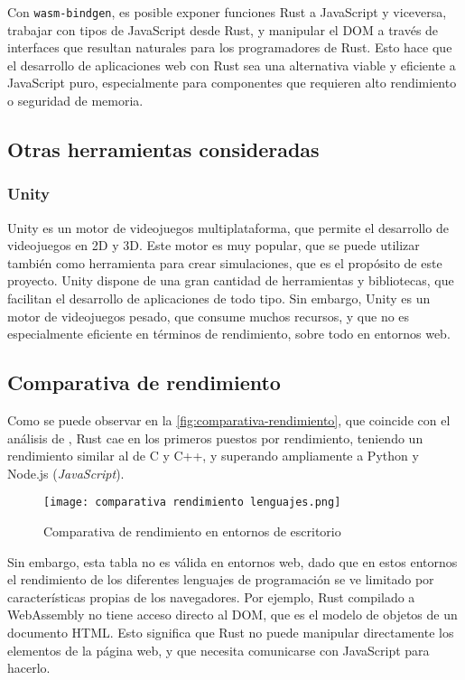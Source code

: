 Con \texttt{wasm-bindgen}, es posible exponer funciones Rust a JavaScript y viceversa, trabajar con tipos de JavaScript desde Rust, y manipular el DOM a través de interfaces que resultan naturales para los programadores de Rust. Esto hace que el desarrollo de aplicaciones web con Rust sea una alternativa viable y eficiente a JavaScript puro, especialmente para componentes que requieren alto rendimiento o seguridad de memoria.

\subsection{Otras herramientas consideradas}
\subsubsection{Unity}
Unity es un motor de videojuegos multiplataforma, que permite el desarrollo de videojuegos en 2D y 3D. Este motor es muy popular, que se puede utilizar también como herramienta para crear simulaciones, que es el propósito de este proyecto. Unity dispone de una gran cantidad de herramientas y bibliotecas, que facilitan el desarrollo de aplicaciones de todo tipo. Sin embargo, Unity es un motor de videojuegos pesado, que consume muchos recursos, y que no es especialmente eficiente en términos de rendimiento, sobre todo en entornos web.

\subsection{Comparativa de rendimiento}

Como se puede observar en la \autoref{fig:comparativa-rendimiento}, que coincide con el análisis de \autocite{samTop10Fastest2024}, Rust cae en los primeros puestos por rendimiento, teniendo un rendimiento similar al de C y C++, y superando ampliamente a Python y Node.js (\textit{JavaScript}).

\begin{figure}[H]
    \centering
    \texttt{[image: comparativa rendimiento lenguajes.png]}
    \caption{Comparativa de rendimiento en entornos de escritorio \autocite{zotero-253}}
    \label{fig:comparativa-rendimiento}
\end{figure}


Sin embargo, esta tabla no es válida en entornos web, dado que en estos entornos el rendimiento de los diferentes lenguajes de programación se ve limitado por características propias de los navegadores. Por ejemplo, Rust compilado a WebAssembly no tiene acceso directo al \ac{DOM}, que es el modelo de objetos de un documento HTML. Esto significa que Rust no puede manipular directamente los elementos de la página web, y que necesita comunicarse con JavaScript para hacerlo. 


